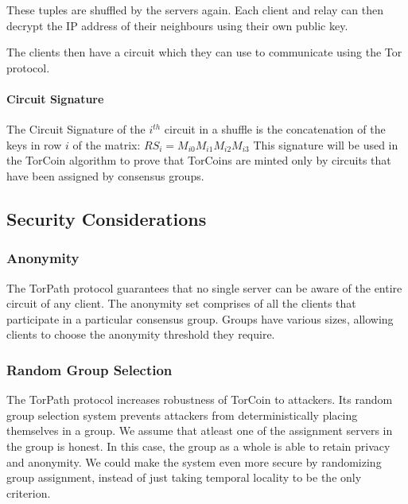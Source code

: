 
These tuples are shuffled by the servers again. Each client and relay can then 
decrypt the IP address of their neighbours using their own public key.

The clients then have a circuit which they can use to communicate using the Tor 
protocol.

\paragraph{Circuit Signature} The Circuit Signature of the $i^{th}$ circuit in
a shuffle is the concatenation of the keys in row $i$ of the matrix: $RS_i =
M_{i0}M_{i1}M_{i2}M_{i3}$ This signature will be used in the TorCoin algorithm
to prove that TorCoins are minted only by circuits that have been assigned by
consensus groups.

\subsection{Security Considerations} 

\subsubsection{Anonymity} The TorPath protocol guarantees that no single
server can be aware of the entire circuit of any client. The anonymity set
comprises of all the clients that participate in a particular consensus group.
Groups have various sizes, allowing clients to choose the anonymity threshold
they require.

\subsubsection{Random Group Selection} The TorPath protocol increases
robustness of TorCoin to attackers. Its random group selection system prevents
attackers from deterministically placing themselves in a group. We assume that
atleast one of the assignment servers in the group is honest. In this case,
the group as a whole is able to retain privacy and anonymity. We could make
the system even more secure by randomizing group assignment, instead of just
taking temporal locality to be the only criterion.



